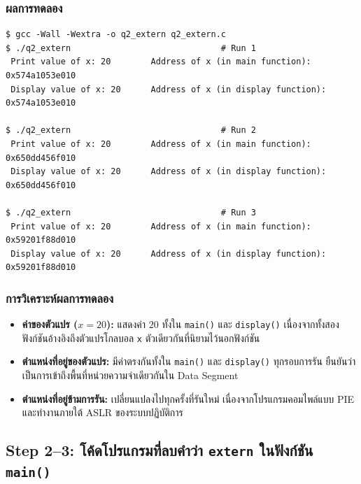 \documentclass[a4paper,11pt]{article}
\newcommand{\code}[1]{\texttt{#1}}
\begin{document}
\subsubsection{ผลการทดลอง}

\begin{lstlisting}[style=terminal,caption={ผลการทดลอง Step 1 (รัน 3 ครั้ง)}]
$ gcc -Wall -Wextra -o q2_extern q2_extern.c
$ ./q2_extern                              # Run 1
 Print value of x: 20        Address of x (in main function):    0x574a1053e010
 Display value of x: 20      Address of x (in display function): 0x574a1053e010

$ ./q2_extern                              # Run 2
 Print value of x: 20        Address of x (in main function):    0x650dd456f010
 Display value of x: 20      Address of x (in display function): 0x650dd456f010

$ ./q2_extern                              # Run 3
 Print value of x: 20        Address of x (in main function):    0x59201f88d010
 Display value of x: 20      Address of x (in display function): 0x59201f88d010
\end{lstlisting}

\subsubsection{การวิเคราะห์ผลการทดลอง}

\begin{itemize}[leftmargin=*]
  \item \textbf{ค่าของตัวแปร ($x = 20$):} แสดงค่า $20$ ทั้งใน \code{main()} และ \code{display()} เนื่องจากทั้งสองฟังก์ชันอ้างอิงถึงตัวแปรโกลบอล \code{x} ตัวเดียวกันที่นิยามไว้นอกฟังก์ชัน
  \item \textbf{ตำแหน่งที่อยู่ของตัวแปร:} มีค่าตรงกันทั้งใน \code{main()} และ \code{display()} ทุกรอบการรัน ยืนยันว่าเป็นการเข้าถึงพื้นที่หน่วยความจำเดียวกันใน Data Segment
  \item \textbf{ตำแหน่งที่อยู่ข้ามการรัน:} เปลี่ยนแปลงไปทุกครั้งที่รันใหม่ เนื่องจากโปรแกรมคอมไพล์แบบ PIE และทำงานภายใต้ ASLR ของระบบปฏิบัติการ
\end{itemize}

\subsection{Step 2--3: โค้ดโปรแกรมที่ลบคำว่า \code{extern} ในฟังก์ชัน \code{main()}}
\end{document}
